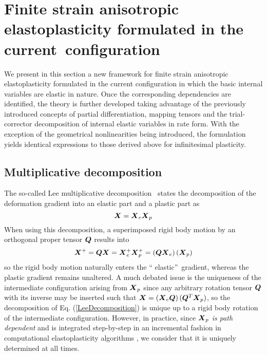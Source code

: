 \documentclass[preprint,review,12pt,sort&compress]{elsarticle}%
\renewcommand{\mathbf}[1]{\mbox{\boldmath $#1$ \unboldmath}  \!\!}
\begin{document}
\section{Finite strain anisotropic elastoplasticity formulated in the
current\ configuration}

We present in this section a new framework for finite strain anisotropic
elastoplasticity formulated in the current configuration in which the basic
internal variables are elastic in nature. Once the corresponding dependencies
are identified, the theory is further developed taking advantage of the
previously introduced concepts of partial differentiation, mapping tensors and
the trial-corrector decomposition of internal elastic variables in rate form.
With the exception of the geometrical nonlinearities being introduced, the
formulation yields identical expressions to those derived above for
infinitesimal plasticity.

\subsection{Multiplicative decomposition}

The so-called Lee multiplicative decomposition \cite{Lee69}\ states the
decomposition of the deformation gradient into an elastic part and a plastic
part as%
\begin{equation}
\mathbf{X}=\mathbf{X}_{e}\mathbf{X}_{p} \label{LeeDecomposition}%
\end{equation}
When using this decomposition, a superimposed rigid body motion by an
orthogonal proper tensor $\mathbf{Q}$ results into%
\begin{equation}
\mathbf{X}^{+}=\mathbf{QX}=\mathbf{X}_{e}^{+}\mathbf{X}_{p}^{+}=\left(
\mathbf{QX}_{e}\right)  \left(  \mathbf{X}_{p}\right)  \label{rigidbodymotion}%
\end{equation}
so the rigid body motion naturally enters the \textquotedblleft
elastic\textquotedblright\ gradient, whereas the plastic gradient remains
unaltered. A much debated issue is the uniqueness of the intermediate
configuration arising from $\mathbf{X}_{p}$ since any arbitrary rotation
tensor $\mathbf{Q}$ with its inverse may be inserted such that $\mathbf{X}%
=\left(  \mathbf{X}_{e}\mathbf{Q}\right)  (\mathbf{Q}^{T}\mathbf{X}_{p})$, so
the decomposition of Eq. (\ref{LeeDecomposition}) is unique up to a rigid body
rotation of the intermediate configuration. However, in practice, since
$\mathbf{X}_{p}$ \emph{is path dependent} and is integrated step-by-step in an
incremental fashion in computational elastoplasticity algorithms
\cite{CamineroMontansBathe11,MontansBenitezCaminero12}, we consider that it is
uniquely determined at all times.
\end{document}
